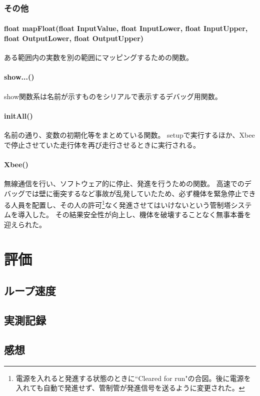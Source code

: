 \documentclass{ltjsreport}
\begin{document}
\subsection{その他}
\subsubsection{float mapFloat(float InputValue, float InputLower, float InputUpper, float OutputLower, float OutputUpper)}
ある範囲内の実数を別の範囲にマッピングするための関数。

\subsubsection{show...()}
show関数系は名前が示すものをシリアルで表示するデバッグ用関数。

\subsubsection{initAll()}
名前の通り、変数の初期化等をまとめている関数。
setupで実行するほか、Xbeeで停止させていた走行体を再び走行させるときに実行される。

\subsubsection{Xbee()}
無線通信を行い、ソフトウェア的に停止、発進を行うための関数。
高速でのデバッグでは壁に衝突するなど事故が乱発していたため、必ず機体を緊急停止できる人員を配置し、その人の許可\footnote{電源を入れると発進する状態のときに``Cleared for run"の合図。後に電源を入れても自動で発進せず、管制管が発進信号を送るように変更された。}なく発進させてはいけないという管制塔システムを導入した。
その結果安全性が向上し、機体を破壊することなく無事本番を迎えられた。




\chapter{評価}

\section{ループ速度}


\section{実測記録}


\section{感想}
\end{document}
